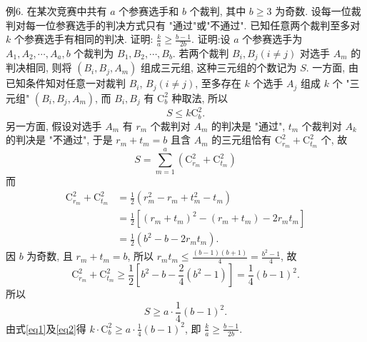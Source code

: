 例6. 在某次竞赛中共有 $a$ 个参赛选手和 $b$ 个裁判, 其中 $b \geqslant 3$ 为奇数.
设每一位裁判对每一位参赛选手的判决方式只有 "通过"或"不通过". 已知任意两个裁判至多对 $k$ 个参赛选手有相同的判决.
证明: $\frac{k}{a} \geqslant \frac{b-1}{2 b}$. 
证明:设 $a$ 个参赛选手为 $A_1, A_2, \cdots, A_a, b$ 个裁判为 $B_1, B_2, \cdots, B_b$. 若两个裁判 $B_i, B_j(i \neq j)$ 对选手 $A_m$ 的判决相同, 则将 $\left(B_i, B_j, A_m\right)$ 组成三元组, 这种三元组的个数记为 $S$. 一方面, 由已知条件知对任意一对裁判 $B_i$, $B_j(i \neq j)$, 至多存在 $k$ 个选手 $A_j$ 组成 $k$ 个 "三元组" $\left(B_i, B_j, A_m\right)$, 而 $B_i, B_j$ 有 $\mathrm{C}_b^2$ 种取法, 所以
$$
S \leqslant k \mathrm{C}_b^2 . \label{eq1}
$$
另一方面, 假设对选手 $A_m$ 有 $r_m$ 个裁判对 $A_m$ 的判决是 "通过", $t_m$ 个裁判对 $A_k$ 的判决是 "不通过", 于是 $r_m+t_m=b$ 且含 $A_m$ 的三元组恰有 $\mathrm{C}_{r_m}^2+\mathrm{C}_{t_m}^2$ 个, 故
$$
S=\sum_{m=1}^a\left(\mathrm{C}_{r_m}^2+\mathrm{C}_{t_m}^2\right)
$$
而
$$
\begin{aligned}
\mathrm{C}_{r_m}^2+\mathrm{C}_{t_m}^2 & =\frac{1}{2}\left(r_m^2-r_m+t_m^2-t_m\right) \\
& =\frac{1}{2}\left[\left(r_m+t_m\right)^2-\left(r_m+t_m\right)-2 r_m t_m\right] \\
& =\frac{1}{2}\left(b^2-b-2 r_m t_m\right) .
\end{aligned}
$$
因 $b$ 为奇数, 且 $r_m+t_m=b$, 所以 $r_m t_m \leqslant \frac{(b-1)(b+1)}{4}=\frac{b^2-1}{4}$, 故
$$
\mathrm{C}_{r_m}^2+\mathrm{C}_{t_m}^2 \geqslant \frac{1}{2}\left[b^2-b-\frac{2}{4}\left(b^2-1\right)\right]=\frac{1}{4}(b-1)^2 .
$$
所以
$$
S \geqslant a \cdot \frac{1}{4}(b-1)^2 . \label{eq2}
$$
由式\ref{eq1}及\ref{eq2}得 $k \cdot \mathrm{C}_b^2 \geqslant a \cdot \frac{1}{4}(b-1)^2$, 即 $\frac{k}{a} \geqslant \frac{b-1}{2 b}$.



